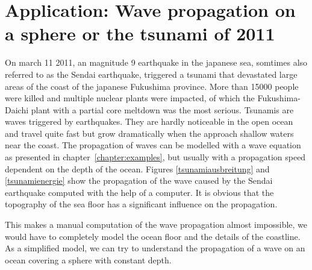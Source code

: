 %
%
%

\section{Application: Wave propagation on a sphere or the tsunami of 2011}
On march 11 2011, an magnitude 9 earthquake in the japanese sea,
somtimes also referred to as the Sendai earthquake, triggered a 
tsunami that devastated large areas of the coast of the japanese
Fukushima province.
More than 15000 people were killed and multiple nuclear plants
were impacted, of which the Fukushima-Daichi plant with a
partial core meltdown was the most serious.
Tsunamis are waves triggered by earthquakes.
They are hardly noticeable in the open ocean and travel quite fast
but grow dramatically when the approach shallow waters near the coast.
The propagation of waves can be modelled with a wave equation as
presented in chapter~\ref{chapter:examples}, but usually with
a propagation speed dependent on the depth of the ocean.
Figures \ref{tsunamiausbreitung} and \ref{tsunamienergie}
show the propagation of the wave caused by the Sendai earthquake
computed with the help of a computer.
It is obvious that the topography of the sea floor has a significant
influence on the propagation.

This makes a manual computation of the wave propagation almost
impossible, we would have to completely model the ocean floor and
the details of the coastline.
As a simplified model, we can try to understand the propagation of a
wave on an ocean covering a sphere with constant depth.

